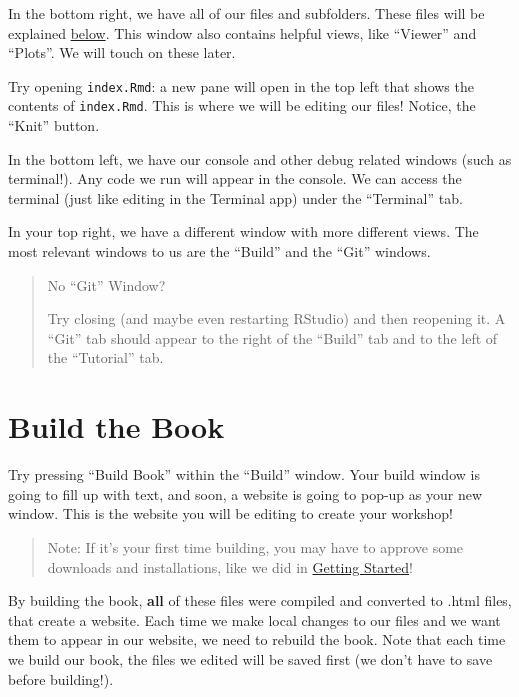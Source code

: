 \documentclass[
]{book}
\theoremstyle{definition}
\theoremstyle{definition}
\theoremstyle{definition}
\theoremstyle{definition}
\theoremstyle{remark}
\begin{document}
In the bottom right, we have all of our files and subfolders. These files will be explained \hyperref[file-setup]{below}. This window also contains helpful views, like ``Viewer'' and ``Plots''. We will touch on these later.

Try opening \texttt{index.Rmd}: a new pane will open in the top left that shows the contents of \texttt{index.Rmd}. This is where we will be editing our files! Notice, the ``Knit'' button.

In the bottom left, we have our console and other debug related windows (such as terminal!). Any code we run will appear in the console. We can access the terminal (just like editing in the Terminal app) under the ``Terminal'' tab.

In your top right, we have a different window with more different views. The most relevant windows to us are the ``Build'' and the ``Git'' windows.

\begin{quote}
No ``Git'' Window?

Try closing (and maybe even restarting RStudio) and then reopening it. A ``Git'' tab should appear to the right of the ``Build'' tab and to the left of the ``Tutorial'' tab.
\end{quote}

\section{Build the Book}\label{build-the-book}

Try pressing ``Build Book'' within the ``Build'' window. Your build window is going to fill up with text, and soon, a website is going to pop-up as your new window. This is the website you will be editing to create your workshop!

\begin{quote}
Note: If it's your first time building, you may have to approve some downloads and installations, like we did in \hyperref[get-started]{Getting Started}!
\end{quote}

By building the book, \textbf{all} of these files were compiled and converted to .html files, that create a website. Each time we make local changes to our files and we want them to appear in our website, we need to rebuild the book. Note that each time we build our book, the files we edited will be saved first (we don't have to save before building!).
\end{document}
